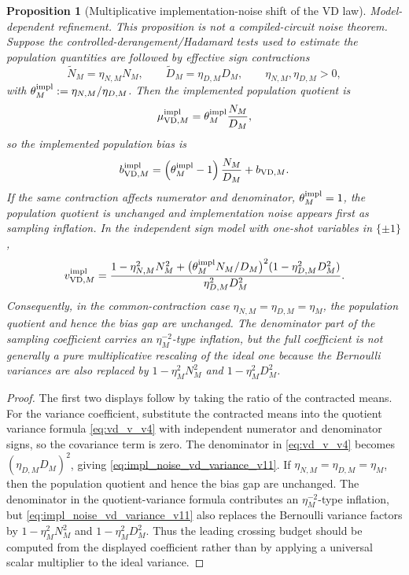 \documentclass[11pt]{article}
\newtheorem{proposition}{Proposition}
\newcommand{\1}{\mathbf{1}}
\begin{document}
\begin{proposition}[Multiplicative implementation-noise shift of the VD law]
\label{prop:impl_noise_shift_v11}
\textnormal{\textit{Model-dependent refinement.}}
\textnormal{\textit{This proposition is not a compiled-circuit noise theorem.}}
Suppose the controlled-derangement/Hadamard tests used to estimate the population quantities are followed by effective sign contractions
\begin{equation}
    \widetilde N_M=\eta_{N,M}N_M,
    \qquad
    \widetilde D_M=\eta_{D,M}D_M,
    \qquad
    \eta_{N,M},\eta_{D,M}>0,
\end{equation}
with \(\theta_M^{\rm impl}:=\eta_{N,M}/\eta_{D,M}\).  Then the implemented population quotient is
\begin{equation}
    \mu_{\mathrm{VD},M}^{\rm impl}=\theta_M^{\rm impl}\frac{N_M}{D_M},
\end{equation}
so the implemented population bias is
\begin{equation}
    b_{\mathrm{VD},M}^{\rm impl}
    =\left(\theta_M^{\rm impl}-1\right)\frac{N_M}{D_M}+b_{\mathrm{VD},M}.
\end{equation}
If the same contraction affects numerator and denominator, \(\theta_M^{\rm impl}=1\), the population quotient is unchanged and implementation noise appears first as sampling inflation.  In the independent sign model with one-shot variables in \(\{\pm1\}\),
\begin{equation}
    v_{\mathrm{VD},M}^{\rm impl}
    =\frac{1-\eta_{N,M}^2N_M^2+\big(\theta_M^{\rm impl}N_M/D_M\big)^2(1-\eta_{D,M}^2D_M^2)}{\eta_{D,M}^2D_M^2}.
    \label{eq:impl_noise_vd_variance_v11}
\end{equation}
Consequently, in the common-contraction case \(\eta_{N,M}=\eta_{D,M}=\eta_M\), the population quotient and hence the bias gap are unchanged.  The denominator part of the sampling coefficient carries an \(\eta_M^{-2}\)-type inflation, but the full coefficient is not generally a pure multiplicative rescaling of the ideal one because the Bernoulli variances are also replaced by \(1-\eta_M^2N_M^2\) and \(1-\eta_M^2D_M^2\).
\end{proposition}

\begin{proof}
The first two displays follow by taking the ratio of the contracted means.  For the variance coefficient, substitute the contracted means into the quotient variance formula \cref{eq:vd_v_v4} with independent numerator and denominator signs, so the covariance term is zero.  The denominator in \cref{eq:vd_v_v4} becomes \((\eta_{D,M}D_M)^2\), giving \cref{eq:impl_noise_vd_variance_v11}.  If \(\eta_{N,M}=\eta_{D,M}=\eta_M\), then the population quotient and hence the bias gap are unchanged.  The denominator in the quotient-variance formula contributes an \(\eta_M^{-2}\)-type inflation, but \cref{eq:impl_noise_vd_variance_v11} also replaces the Bernoulli variance factors by \(1-\eta_M^2N_M^2\) and \(1-\eta_M^2D_M^2\).  Thus the leading crossing budget should be computed from the displayed coefficient rather than by applying a universal scalar multiplier to the ideal variance.
\end{proof}
\end{document}
